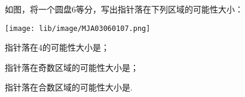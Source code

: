 如图，将一个圆盘6等分，写出指针落在下列区域的可能性大小：

\begin{center}

    \texttt{[image: lib/image/MJA03060107.png]}

\end{center}

\begin{subquestions}

    \subquestion 指针落在4的可能性大小是\key{\hspace{2cm}}；

    \subquestion 指针落在奇数区域的可能性大小是\key{\hspace{2cm}}；

    \subquestion 指针落在合数区域的可能性大小是\key{\hspace{2cm}}.    

\end{subquestions}





